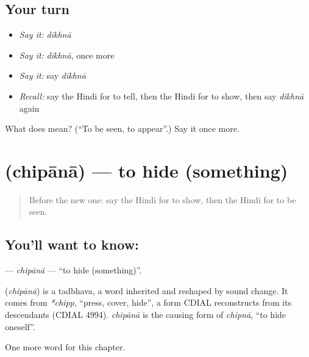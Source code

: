 \subsection*{Your turn}
\begin{itemize}
\raggedright
  \item \emph{Say it:} \emph{dikhnā}
  \item \emph{Say it:} \emph{dikhnā}, once more
  \item \emph{Say it:} say \emph{dikhnā}
  \item \emph{Recall:} say the Hindi for to tell, then the Hindi for to show, then say \emph{dikhnā} again
\end{itemize}

\begin{tcolorbox}[breakable,colback=teal!4,colframe=teal!35!black,title={Before you move on}]
What does  mean? (\textquotedblleft{}To be seen, to appear\textquotedblright{}.) Say it once more.
\end{tcolorbox}
\section[\texorpdfstring{\hi{छिपाना} (chipānā)}{छिपाना (chipānā)}]{ (chipānā) — to hide (something)}

\label{lesson:HI-C171-chipana}



\begin{quote}
Before the new one: say the Hindi for to show, then the Hindi for to be seen.
\end{quote}

\subsection*{You'll want to know: }
\textbf{} — \emph{chipānā} — \textquotedblleft{}to hide (something)\textquotedblright{}.

\begin{cousinweb}
\textbf{} (\emph{chipānā}) is a tadbhava, a word inherited and reshaped by sound change. It comes from \emph{*chipp}, \textquotedblleft{}press, cover, hide\textquotedblright{}, a form CDIAL reconstructs from its descendants (CDIAL 4994). \emph{chipānā} is the causing form of \emph{chipnā}, \textquotedblleft{}to hide oneself\textquotedblright{}.
\end{cousinweb}

\begin{grammarlens}[title={What you've built}]
One more word for this chapter.
\end{grammarlens}

